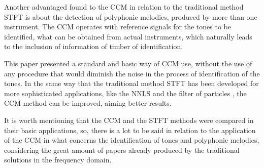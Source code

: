 \documentclass{article}
\begin{document}
	Another advantaged found to the CCM in relation to the traditional method STFT is about the detection of polyphonic melodies, produced by more than one instrument. The CCM operates with reference signals for the tones to be identified, what can be obtained from actual instruments, which naturally leads to the inclusion of information of timber of identification. 

	This paper presented a standard and basic way of CCM use, without the use of any procedure that would diminish the noise in the process of identification of the tones. In the same way that the traditional method STFT has been developed for more sophisticated applications, like the NNLS \cite{mauch2010approximate} and the filter of particles \cite{jo2010melody}, the CCM method can be improved, aiming better results.
	
	It is worth mentioning that the CCM and the STFT methods were compared in their basic applications, so, there is a lot to be said in relation to the application of the CCM in what concerns the identification of tones and polyphonic melodies, considering the great amount of papers already produced by the traditional solutions in the frequency domain. 




%
%
%
%
\end{document}
